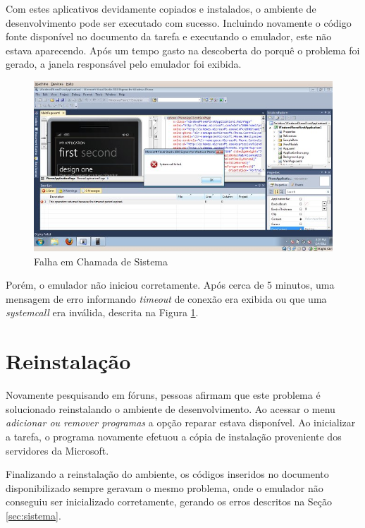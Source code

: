 \documentclass{article}
\begin{document}
Com estes aplicativos devidamente copiados e instalados, o ambiente de
desenvolvimento pode ser executado com sucesso. Incluindo novamente o código
fonte disponível no documento da tarefa e executando o emulador, este não estava
aparecendo. Após um tempo gasto na descoberta do porquê o problema foi gerado, a
janela responsável pelo emulador foi exibida.

\begin{figure}
    \centering{}
    \includegraphics[width=\textwidth]{system-call-failed}
    \caption{Falha em Chamada de Sistema}
    \label{fig:system-call-failed}
\end{figure}

Porém, o emulador não iniciou corretamente. Após cerca de 5 minutos, uma
mensagem de erro informando \textit{timeout} de conexão era exibida ou que uma
\textit{systemcall} era inválida, descrita na Figura
\ref{fig:system-call-failed}.

\section{Reinstalação}
\label{sec:reinstalacao}

Novamente pesquisando em fóruns, pessoas afirmam que este problema é solucionado
reinstalando o ambiente de desenvolvimento. Ao acessar o menu \textit{adicionar
ou remover programas} a opção reparar estava disponível. Ao inicializar a
tarefa, o programa novamente efetuou a cópia de instalação proveniente dos
servidores da Microsoft.

Finalizando a reinstalação do ambiente, os códigos inseridos no documento
disponibilizado sempre geravam o mesmo problema, onde o emulador não conseguiu
ser inicializado corretamente, gerando os erros descritos na Seção
\ref{sec:sistema}.
\end{document}
